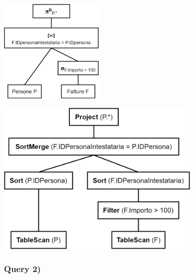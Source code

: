 \documentclass[a4paper,12pt]{article}
\begin{document}
\begin{minipage}{\textwidth}
\begin{multicols}{2}

\null \vfill
\includegraphics[height=5cm]{ Albero logico 1.png }
\vfill \null

\columnbreak

\includegraphics[height=7.5cm]{ Albero fisico 1.png }
\end{multicols}
\end{minipage}

 \subsubsection{ Query 2) }
\end{document}
